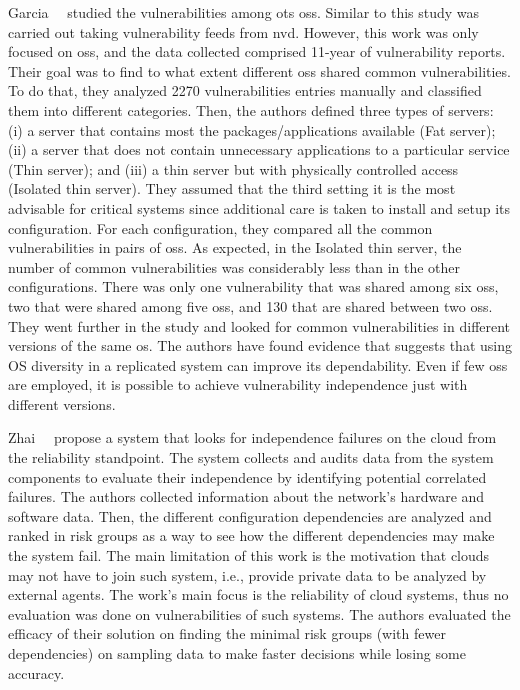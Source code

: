 Garcia~\etal{}~\cite{Garcia:2012} studied the vulnerabilities among \gls{ots} \glspl{os}. 
Similar to \cite{Han:2009} this study was carried out taking vulnerability feeds from \gls{nvd}. 
However, this work was only focused on \glspl{os}, and the data collected comprised 11-year of vulnerability reports. 
Their goal was to find to what extent different \glspl{os} shared common vulnerabilities. 
To do that, they analyzed 2270 vulnerabilities entries manually and classified them into different categories. 
Then, the authors defined three types of servers: (i) a server that contains most the packages/applications available (Fat server); (ii) a server that does not contain unnecessary applications to a particular
service (Thin server); and (iii) a thin server but with physically controlled access (Isolated thin server). 
They assumed that the third setting it is the most advisable for critical systems since additional care is taken to install and setup its configuration. 
For each configuration, they compared all the common vulnerabilities in pairs of \glspl{os}. 
As expected, in the Isolated thin server, the number of common vulnerabilities was considerably less than in the other configurations. 
There was only one vulnerability that was shared among six \glspl{os}, two that were shared among five \glspl{os}, and 130 that are shared between two \glspl{os}. 
They went further in the study and looked for common vulnerabilities in different versions of the same \gls{os}. 
The authors have found evidence that suggests that using OS diversity in a replicated system can improve its dependability. 
Even if few \glspl{os} are employed, it is possible to achieve vulnerability independence just with different versions.



Zhai~\etal{}~\cite{Zhai:2014} propose a system that looks for independence failures on the cloud from the reliability standpoint. 
The system collects and audits data from the system components to evaluate their independence by identifying potential correlated failures.
The authors collected information about the network's hardware and software data.
Then, the different configuration dependencies are analyzed and ranked in risk groups as a way to see how the different dependencies may make the system fail.
The main limitation of this work is the motivation that clouds may not have to join such system, i.e., provide private data to be analyzed by external agents.
The work's main focus is the reliability of cloud systems, thus no evaluation was done on vulnerabilities of such systems.
The authors evaluated the efficacy of their solution on finding the minimal risk groups (with fewer dependencies) on sampling data to make faster decisions while losing some accuracy.


